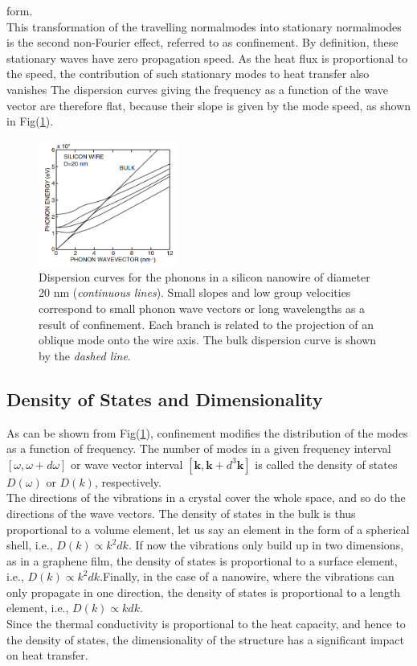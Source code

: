 form.\\
\indent This transformation of the travelling normalmodes into stationary normalmodes
is the second non-Fourier effect, referred to as confinement. By definition, these
stationary waves have zero propagation speed. As the heat flux is proportional to
the speed, the contribution of such stationary modes to heat transfer also vanishes The dispersion curves giving the frequency as a function of the wave vector are
therefore flat, because their slope is given by the mode speed, as shown in Fig(\ref{fig:mingopic}).
\begin{figure}[htbp!] 
\centering    
\includegraphics[width=0.4\textwidth]{2.png}
\caption[confinement]{Dispersion curves for the phonons in a silicon nanowire of diameter 20 nm (\textit{continuous
lines}). Small slopes and low group velocities correspond to small phonon wave vectors or long
wavelengths as a result of confinement. Each branch is related to the projection of an oblique mode
onto the wire axis. The bulk dispersion curve is shown by the \textit{dashed line}.\cite{mingolbook}}
\label{fig:mingopic}
\end{figure}{}
\subsection{Density of States and Dimensionality}
As can be shown from Fig(\ref{fig:mingopic}), confinement modifies the distribution of the modes
as a function of frequency. The number of modes in a given frequency interval$[\omega, \omega + d \omega]$ or wave vector interval $[\textbf{k},\textbf{k}+d^3 \textbf{k}]$ is called the density of states $D(\omega)$ or $D(k)$, respectively.\\
\indent The directions of the vibrations in a crystal cover the whole space, and so do the
directions of the wave vectors. The density of states in the bulk is thus proportional
to a volume element, let us say an element in the form of a spherical shell, i.e., $D(k) \propto k^2 dk$. If now the vibrations only build up in two dimensions, as in a graphene
film, the density of states is proportional to a surface element, i.e., $D(k) \propto k^2 dk$.Finally, in the case of a nanowire, where the vibrations can only propagate in one
direction, the density of states is proportional to a length element, i.e., $D(k) \propto k dk$.\\
\indent Since the thermal conductivity is proportional to the heat capacity, and
hence to the density of states, the dimensionality of the structure has a significant
impact on heat transfer. 


